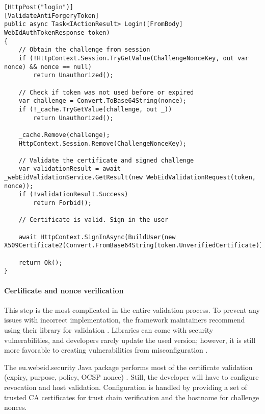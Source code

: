 \begin{lstlisting}[caption={Web eID Login Endpoint}, label={lst:web-eid-login}]
[HttpPost("login")]
[ValidateAntiForgeryToken]
public async Task<IActionResult> Login([FromBody] WebIdAuthTokenResponse token)
{
    // Obtain the challenge from session
    if (!HttpContext.Session.TryGetValue(ChallengeNonceKey, out var nonce) && nonce == null)
        return Unauthorized();

    // Check if token was not used before or expired
    var challenge = Convert.ToBase64String(nonce);
    if (!_cache.TryGetValue(challenge, out _))
        return Unauthorized();

    _cache.Remove(challenge);
    HttpContext.Session.Remove(ChallengeNonceKey);

    // Validate the certificate and signed challenge
    var validationResult = await _webEidValidationService.GetResult(new WebEidValidationRequest(token, nonce));
    if (!validationResult.Success)
        return Forbid();

    // Certificate is valid. Sign in the user

    await HttpContext.SignInAsync(BuildUser(new X509Certificate2(Convert.FromBase64String(token.UnverifiedCertificate)).Subject));

    return Ok();
}
\end{lstlisting}

\paragraph{Certificate and nonce verification}

This step is the most complicated in the entire validation process. To prevent any issues with incorrect implementation, the framework maintainers recommend using their library for validation \cite{ria-webeid-source-web-eid-authtoken-validation-java-readme}. Libraries can come with security vulnerabilities, and developers rarely update the used version; however, it is still more favorable to creating vulnerabilities from misconfiguration \cite{9240619}.

The eu.webeid.security Java package performs most of the certificate validation (expiry, purpose, policy, OCSP nonce) \cite{ria-webeid-source-web-eid-authtoken-validation-java-readme}. Still, the developer will have to configure revocation and host validation. Configuration is handled by providing a set of trusted CA certificates for trust chain verification and the hostname for challenge nonces.

